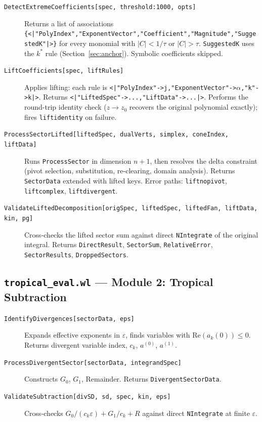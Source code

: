 \documentclass[11pt,a4paper]{article}
\begin{document}
\begin{description}
  \item[\texttt{DetectExtremeCoefficients[spec, threshold:1000, opts]}] Returns a list of associations \texttt{\{<|"PolyIndex","ExponentVector","Coefficient","Magnitude","SuggestedK"|>\}} for every monomial with $|C|<1/\tau$ or $|C|>\tau$. \texttt{SuggestedK} uses the $k^*$ rule (Section~\ref{sec:anchor}). Symbolic coefficients skipped.

  \item[\texttt{LiftCoefficients[spec, liftRules]}] Applies lifting: each rule is \texttt{<|"PolyIndex"->j,"ExponentVector"->$\alpha$,"k"->k|>}. Returns \texttt{<|"LiftedSpec"->...,"LiftData"->...|>}. Performs the round-trip identity check ($z\to z_0$ recovers the original polynomial exactly); fires \texttt{liftidentity} on failure.

  \item[\texttt{ProcessSectorLifted[liftedSpec, dualVerts, simplex, coneIndex, liftData]}] Runs \texttt{ProcessSector} in dimension $n{+}1$, then resolves the delta constraint (pivot selection, substitution, re-clearing, domain analysis). Returns \texttt{SectorData} extended with lifted keys. Error paths: \texttt{liftnopivot}, \texttt{liftcomplex}, \texttt{liftdivergent}.

  \item[\texttt{ValidateLiftedDecomposition[origSpec, liftedSpec, liftedFan, liftData, kin, pg]}] Cross-checks the lifted sector sum against direct \texttt{NIntegrate} of the original integral. Returns \texttt{DirectResult}, \texttt{SectorSum}, \texttt{RelativeError}, \texttt{SectorResults}, \texttt{DroppedSectors}.
\end{description}

\subsection{\texttt{tropical\_eval.wl} --- Module 2: Tropical Subtraction}

\begin{description}
  \item[\texttt{IdentifyDivergences[sectorData, eps]}] Expands effective exponents in $\varepsilon$, finds variables with $\mathrm{Re}(a_k(0))\leq 0$. Returns divergent variable index, $c_k$, $a^{(0)}$, $a^{(1)}$.
  \item[\texttt{ProcessDivergentSector[sectorData, integrandSpec]}] Constructs $G_0$, $G_1$, Remainder. Returns \texttt{DivergentSectorData}.
  \item[\texttt{ValidateSubtraction[divSD, sd, spec, kin, eps]}] Cross-checks $G_0/(c_k\varepsilon)+G_1/c_k+R$ against direct \texttt{NIntegrate} at finite $\varepsilon$.
\end{description}
\end{document}
